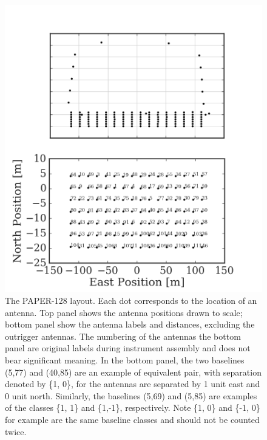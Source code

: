 \documentclass[twocolumn,apj,numberedappendix]{emulateapj}
\renewcommand\[{\begin{equation}}
\renewcommand\]{\end{equation}}
\begin{document}
\begin{figure}[H]
\includegraphics[width=\linewidth]{antpos128}

\caption{The PAPER-128 layout. Each dot corresponds to the location of
an antenna. Top panel shows the antenna positions drawn to scale;
bottom panel show the antenna labels and distances, excluding the outrigger
antennas.
The numbering of the antennas the bottom panel are original labels
during instrument assembly and does not bear significant
meaning. In the bottom panel, the two baselines (5,77) and (40,85) are an example of equivalent pair, with separation denoted by \{1, 0\}, for the
antennas are separated by 1 unit east and 0 unit north. Similarly,
the baselines (5,69) and (5,85) are examples
of the classes \{1, 1\} and \{1,-1\}, respectively. Note \{1, 0\} and \{-1, 0\} for example
are the same baseline classes and should not be counted twice.}
\label{fig:AntPos}
\end{figure}
\end{document}

